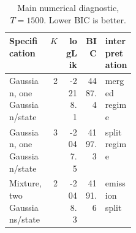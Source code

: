 \begin{table}[t]
\centering
\small
\caption{Main numerical diagnostic, $T=1500$. Lower BIC is better.}
\label{tab:sim}
\begin{tabular}{@{}lrrrp{0.24\linewidth}@{}}
\toprule
Specification & $K$ & logLik & BIC & interpretation\\
\midrule
Gaussian, one Gaussian/state & 2 & -2218.1 & 4487.4 & merged regime\\
Gaussian, one Gaussian/state & 3 & -2047.5 & 4197.3 & split regime\\
Mixture, two Gaussians/state & 2 & -2048.3 & 4191.6 & emission split\\
\bottomrule
\end{tabular}
\end{table}
